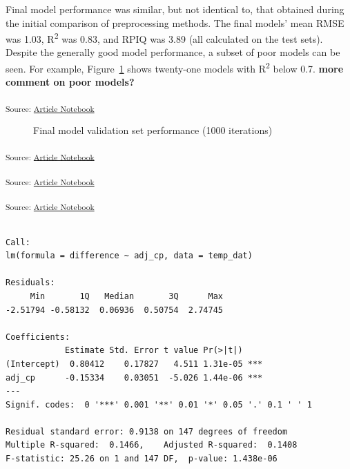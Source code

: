 \documentclass[
]{agujournal2019}
\begin{document}
Final model performance was similar, but not identical to, that obtained
during the initial comparison of preprocessing methods. The final
models' mean RMSE was 1.03, R\textsuperscript{2} was 0.83, and RPIQ was
3.89 (all calculated on the test sets). Despite the generally good model
performance, a subset of poor models can be seen. For example,
Figure~\ref{fig-final-metric-boxplot} shows twenty-one models with
R\textsuperscript{2} below 0.7. \textbf{more comment on poor models?}

\textsubscript{Source:
\href{https://rvcrawford.github.io/glowing-system/index.qmd.html}{Article
Notebook}}

\label{cell-fig-final-metric-boxplot}
\begin{figure}[H]


\caption{\label{fig-final-metric-boxplot}Final model validation set
performance (1000 iterations)}

\end{figure}%

\textsubscript{Source:
\href{https://rvcrawford.github.io/glowing-system/index.qmd.html}{Article
Notebook}}

\textsubscript{Source:
\href{https://rvcrawford.github.io/glowing-system/index.qmd.html}{Article
Notebook}}

\textsubscript{Source:
\href{https://rvcrawford.github.io/glowing-system/index.qmd.html}{Article
Notebook}}

\begin{verbatim}

Call:
lm(formula = difference ~ adj_cp, data = temp_dat)

Residuals:
     Min       1Q   Median       3Q      Max 
-2.51794 -0.58132  0.06936  0.50754  2.74745 

Coefficients:
            Estimate Std. Error t value Pr(>|t|)    
(Intercept)  0.80412    0.17827   4.511 1.31e-05 ***
adj_cp      -0.15334    0.03051  -5.026 1.44e-06 ***
---
Signif. codes:  0 '***' 0.001 '**' 0.01 '*' 0.05 '.' 0.1 ' ' 1

Residual standard error: 0.9138 on 147 degrees of freedom
Multiple R-squared:  0.1466,    Adjusted R-squared:  0.1408 
F-statistic: 25.26 on 1 and 147 DF,  p-value: 1.438e-06
\end{verbatim}
\end{document}
